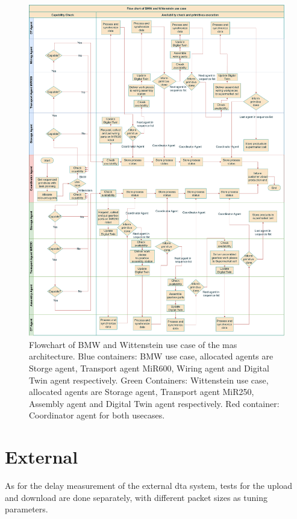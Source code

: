 \begin{figure}[htb]
    \includegraphics[width=\textwidth]{figures/tests/usecase/Usecase_flow.pdf}\hfill 
    \caption{Flowchart of BMW and Wittenstein use case of the \gls{mas} architecture. 
    Blue containers: BMW use case, allocated agents are Storge agent, 
    Transport agent MiR600, Wiring agent and Digital Twin agent respectively. 
    Green Containers: Wittenstein use case, allocated agents are Storage agent, 
    Transport agent MiR250, Assembly agent and Digital Twin agent respectively. 
    Red container: Coordinator agent for both usecases.} 
    \label{fig: Flowchart-usecase}
\end{figure}













\section{External}\label{chap: Result-External}
As for the delay measurement of the external \gls{dta} system, tests for the 
upload and download are done separately, with different packet sizes as tuning 
parameters. 


